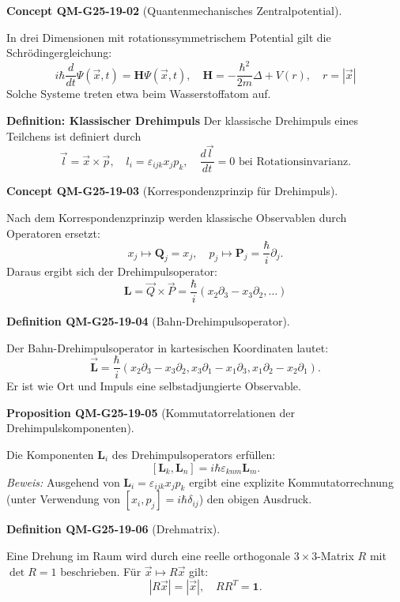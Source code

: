 \documentclass[10pt, letterpaper]{article}
\newcommand{\CustomHeading}[3]{%
  \par\medskip\noindent%
  \textbf{#1 #2} \textnormal{(#3)}.\enskip%
}
\newenvironment{DEF}[2]{\CustomHeading{Definition}{#1}{#2}}{}
\newenvironment{PROP}[2]{\CustomHeading{Proposition}{#1}{#2}}{}
\newenvironment{CONC}[2]{\CustomHeading{Concept}{#1}{#2}}{}
\begin{document}
\begin{CONC}{QM-G25-19-02}{Quantenmechanisches Zentralpotential}
In drei Dimensionen mit rotationssymmetrischem Potential gilt die Schrödingergleichung:  
$$
i \hbar \frac{d}{d t} \Psi(\vec{x}, t)=\mathbf{H} \Psi(\vec{x}, t), \quad \mathbf{H}=-\frac{\hbar^{2}}{2 m} \Delta+V(r), \quad r=|\vec{x}|
$$  
Solche Systeme treten etwa beim Wasserstoffatom auf.


\textbf{Definition: Klassischer Drehimpuls}  
Der klassische Drehimpuls eines Teilchens ist definiert durch  
$$
\vec{l} = \vec{x} \times \vec{p}, \quad l_i = \varepsilon_{ijk} x_j p_k, \quad \frac{d\vec{l}}{dt} = 0 \text{ bei Rotationsinvarianz}.
$$
\end{CONC}

\begin{CONC}{QM-G25-19-03}{Korrespondenzprinzip für Drehimpuls}
Nach dem Korrespondenzprinzip werden klassische Observablen durch Operatoren ersetzt:
$$
x_j \mapsto \mathbf{Q}_j = x_j, \quad p_j \mapsto \mathbf{P}_j = \frac{\hbar}{i} \partial_j.
$$
Daraus ergibt sich der Drehimpulsoperator:  
$$
\mathbf{L} = \vec{Q} \times \vec{P} = \frac{\hbar}{i} (x_2 \partial_3 - x_3 \partial_2, \dots)
$$
\end{CONC}

\begin{DEF}{QM-G25-19-04}{Bahn-Drehimpulsoperator}
Der Bahn-Drehimpulsoperator in kartesischen Koordinaten lautet:  
$$
\overrightarrow{\mathbf{L}} = \frac{\hbar}{i}(x_2 \partial_3 - x_3 \partial_2, x_3 \partial_1 - x_1 \partial_3, x_1 \partial_2 - x_2 \partial_1).
$$
Er ist wie Ort und Impuls eine selbstadjungierte Observable.
\end{DEF}

\begin{PROP}{QM-G25-19-05}{Kommutatorrelationen der Drehimpulskomponenten}
Die Komponenten $\mathbf{L}_i$ des Drehimpulsoperators erfüllen:
$$
[\mathbf{L}_k, \mathbf{L}_n] = i \hbar \varepsilon_{knm} \mathbf{L}_m.
$$  
\textit{Beweis:} Ausgehend von $\mathbf{L}_i = \varepsilon_{ijk} x_j p_k$ ergibt eine explizite Kommutatorrechnung (unter Verwendung von $[x_i, p_j] = i \hbar \delta_{ij}$) den obigen Ausdruck.
\end{PROP}

\begin{DEF}{QM-G25-19-06}{Drehmatrix}
Eine Drehung im Raum wird durch eine reelle orthogonale $3 \times 3$-Matrix $R$ mit $\det R = 1$ beschrieben. Für $\vec{x} \mapsto R \vec{x}$ gilt:  
$$
|R \vec{x}| = |\vec{x}|, \quad R R^T = \mathbf{1}.
$$
\end{DEF}
\end{document}
